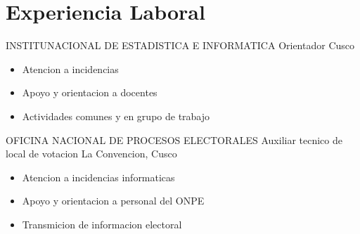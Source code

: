 \section{Experiencia Laboral}

        {INSTITUNACIONAL DE ESTADISTICA E INFORMATICA}
        {Orientador}
        {Cusco}
        {} 
        {
        \begin{itemize}
            \item Atencion a incidencias 
            \item Apoyo y orientacion a docentes
            \item Actividades comunes y en grupo de trabajo
        \end{itemize}
        }
        
        {OFICINA NACIONAL DE PROCESOS ELECTORALES}
        {Auxiliar tecnico de local de votacion}
        {La Convencion, Cusco}
        {} 
        {
        \begin{itemize}
            \item Atencion a incidencias informaticas
            \item Apoyo y orientacion a personal del ONPE
            \item Transmicion de informacion electoral
        \end{itemize}
        }


